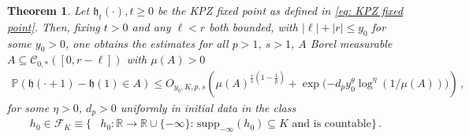 \documentclass[11pt, reqno]{amsart}
\numberwithin{equation}{section}
\newcounter{dummy} \numberwithin{dummy}{section}
\newtheorem{theorem}[dummy]{Theorem}
\newcommand{\R}{\ensuremath{\mathbb{R}}}
\newcommand{\PP}{\ensuremath{\mathbb{P}}}
\begin{document}
\begin{theorem}\label{thm: KPZ law local uniform comparison}
     Let $\mathfrak{h}_t(\cdot), t\ge 0$ be the KPZ fixed point as defined in \eqref{eq: KPZ fixed point}. Then, fixing $t>0$ and any $\ell<r$ both bounded, with $|\ell|+ |r|\le y_0$ for some $y_0>0$, one obtains the estimates for all  $p>1$,  $s>1$, $A$ Borel measurable $A\subseteq \mathscr{C}_{0,*}([0,r-\ell])$ with $\mu(A) > 0$
\begin{equation*}
\begin{array}{cc}
     \PP(\mathfrak{h}(\cdot + 1)-\mathfrak{h}(1)\in A) \le O_{y_0, K, p,s}\left(\mu(A)^{\frac{\varepsilon}{s}(1-\frac{1}{p})} + \exp\bigg({-d_p y_0^\theta  \log^{\eta} \left(1/\mu(A)\right)}\bigg)\right)\,,
\end{array}
\end{equation*} 
for some $\eta> 0$, $d_p>0$ uniformly in initial data in the class
\begin{align*}
 h_0\in \mathcal{F}_{K}\equiv\{&h_0: \R \to\mathbb{R}\cup \{-\infty\}:\,\mathrm{supp}_{-\infty}(h_0)\subseteq K \text{ and is countable}\}\,.
\end{align*}
\end{theorem}
\end{document}
